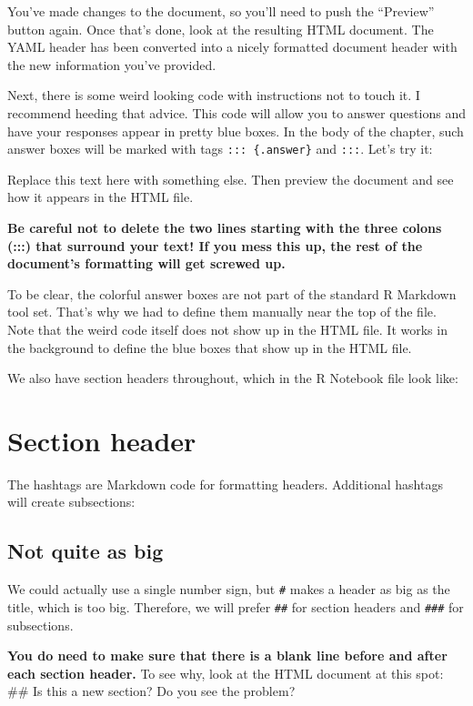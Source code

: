 \documentclass[
]{book}
\begin{document}
You've made changes to the document, so you'll need to push the ``Preview'' button again. Once that's done, look at the resulting HTML document. The YAML header has been converted into a nicely formatted document header with the new information you've provided.

Next, there is some weird looking code with instructions not to touch it. I recommend heeding that advice. This code will allow you to answer questions and have your responses appear in pretty blue boxes. In the body of the chapter, such answer boxes will be marked with tags \texttt{:::\ \{.answer\}} and \texttt{:::}. Let's try it:

Replace this text here with something else. Then preview the document and see how it appears in the HTML file.

\textbf{Be careful not to delete the two lines starting with the three colons (:::) that surround your text! If you mess this up, the rest of the document's formatting will get screwed up.}

To be clear, the colorful answer boxes are not part of the standard R Markdown tool set. That's why we had to define them manually near the top of the file. Note that the weird code itself does not show up in the HTML file. It works in the background to define the blue boxes that show up in the HTML file.

We also have section headers throughout, which in the R Notebook file look like:

\hypertarget{section-header}{%
\section*{Section header}\label{section-header}}

The hashtags are Markdown code for formatting headers. Additional hashtags will create subsections:

\hypertarget{not-quite-as-big}{%
\subsection*{Not quite as big}\label{not-quite-as-big}}

We could actually use a single number sign, but \texttt{\#} makes a header as big as the title, which is too big. Therefore, we will prefer \texttt{\#\#} for section headers and \texttt{\#\#\#} for subsections.

\textbf{You do need to make sure that there is a blank line before and after each section header.} To see why, look at the HTML document at this spot:
\#\# Is this a new section?
Do you see the problem?
\end{document}
